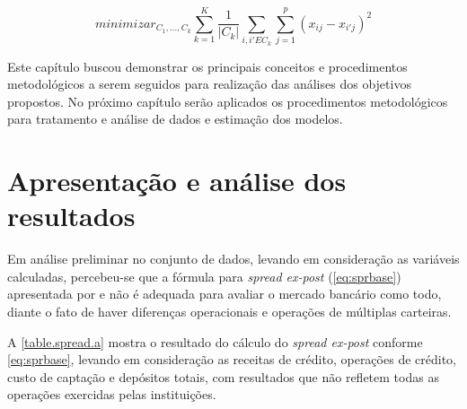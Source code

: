 \documentclass[
  12pt,
  12pt,
  openright,
  oneside,
  a4paper,
  chapter=TITLE,
  section=TITLE,
  subsection=TITLE,
  subsubsection=TITLE,
  english,
  portugues,
  sumario=tradicional]{abntex2}
\begin{document}
\begin{equation}
minimizar_{C_1,...,C_k} \sum_{k = 1}^{K}\frac{1}{|C_k|}\sum_{i,i' E C_k} \sum_{j=1}^{p}(x_{ij} - x_{i'j})^2 
\end{equation}

Este capítulo buscou demonstrar os principais conceitos e procedimentos metodológicos a serem seguidos para realização das análises dos objetivos propostos. No próximo capítulo serão aplicados os procedimentos metodológicos para tratamento e análise de dados e estimação dos modelos.

\textual
\pagestyle{simple}
\parindent 1.50cm

\chapter{Apresentação e análise dos resultados}

Em análise preliminar no conjunto de dados, levando em consideração as variáveis calculadas, percebeu-se que a fórmula para \emph{spread ex-post} (\autoref{eq:sprbase}) apresentada por \textcite{dantas:2012} e \textcite{timotio:2018} não é adequada para avaliar o mercado bancário como todo, diante o fato de haver diferenças operacionais e operações de múltiplas carteiras.

A \autoref{table.spread.a} mostra o resultado do cálculo do \emph{spread ex-post} conforme \autoref{eq:sprbase}, levando em consideração as receitas de crédito, operações de crédito, custo de captação e depósitos totais, com resultados que não refletem todas as operações exercidas pelas instituições.
\end{document}
